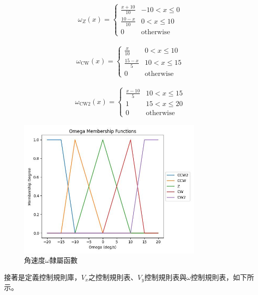 \documentclass[12pt]{article}       %
\begin{document}
\begin{align}
    \omega_{Z}(x) = 
    \begin{cases}
    \frac{x + 10}{10} & -10 < x \le 0 \\
    \frac{10 - x}{10} & 0 < x \le 10 \\
    0 & \text{otherwise}
    \end{cases}    
\end{align}

\begin{align}
    \omega_{\text{CW}}(x) = 
    \begin{cases}
    \frac{x}{10} & 0 < x \le 10 \\
    \frac{15 - x}{5} & 10 < x \le 15 \\
    0 & \text{otherwise}
    \end{cases}      
\end{align}

\begin{align}
    \omega_{\text{CW2}}(x) = 
    \begin{cases}
    \frac{x - 10}{5} & 10 < x \le 15 \\
    1 & 15 < x \le 20 \\
    0 & \text{otherwise}
    \end{cases}      
\end{align}

\begin{figure}[H]
    \centering
    \includegraphics[width=0.8\textwidth]{24.jpg}     %
    \caption{角速度$\omega$隸屬函數}    %
    \label{fig:24}    %
\end{figure}

接著是定義控制規則庫，$V_{x}$之控制規則表、$V_{y}$控制規則表與$\omega$控制規則表，如下所示。
\end{document}
